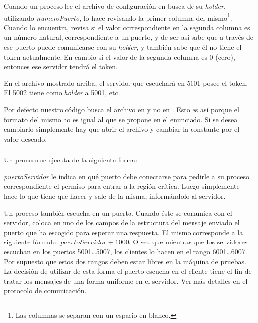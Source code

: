 Cuando un proceso  lee el archivo de configuración en busca de
su \emph{holder}, utilizando \emph{numeroPuerto}, lo hace revisando la primer
columna del mismo\footnote{Las columnas se separan con un espacio en blanco.}.
Cuando lo encuentra, revisa si el valor correspondiente en la segunda columna
es un número natural, correspondiente a un puerto, y de ser así sabe que a
través de ese puerto puede comunicarse con su \emph{holder}, y también sabe que
él no tiene el token actualmente. En cambio si el valor de la segunda columna es
0 (cero), entonces ese servidor tendrá el token.

En el archivo mostrado arriba, el servidor que escuchará en 5001 posee el token.
El 5002 tiene como \emph{holder} a 5001, etc.

Por defecto nuestro código busca el archivo  en
 y no en . Esto es así porque el formato del
mismo no es igual al que se propone en el enunciado. Si se desea cambiarlo
simplemente hay que abrir el archivo  y cambiar la
constante  por el valor deseado.


\subsubsection{}

Un proceso  se ejecuta de la siguiente forma:


\emph{puertoServidor} le indica en qué puerto debe conectarse para pedirle a su
proceso  correspondiente el permiso para entrar a la región
crítica. Luego simplemente hace lo que tiene que hacer y sale de la misma,
informándolo al servidor.

Un proceso  también escucha en un puerto. Cuando éste se
comunica con el servidor, coloca en uno de los campos de la estructura del
mensaje enviado el puerto que ha escogido para esperar una respuesta. El
mismo corresponde a la siguiente fórmula: $puertoServidor + 1000$. O sea que
mientras que los servidores escuchan en los puertos 5001\ldots5007, los clientes
lo hacen en el rango 6001\ldots6007. Por supuesto que estos dos rangos deben
estar libres en la máquina de pruebas. La decisión de utilizar de esta forma el 
puerto escucha en el cliente tiene el fin de tratar los mensajes de una forma
uniforme en el servidor. Ver más detalles en el protocolo de comunicación.


